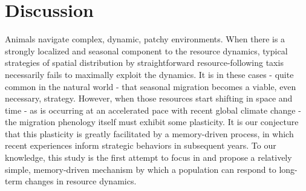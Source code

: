 \documentclass[12pt]{article}
\begin{document}
\hypertarget{discussion}{%
\section{Discussion}\label{discussion}}

Animals navigate complex, dynamic, patchy environments. When there is a
strongly localized and seasonal component to the resource dynamics,
typical strategies of spatial distribution by straightforward
resource-following taxis necessarily fails to maximally exploit the
dynamics. It is in these cases - quite common in the natural world -
that seasonal migration becomes a viable, even necessary, strategy.
However, when those resources start shifting in space and time - as is
occurring at an accelerated pace with recent global climate change - the
migration phenology itself must exhibit some plasticity. It is our
conjecture that this plasticity is greatly facilitated by a
memory-driven process, in which recent experiences inform strategic
behaviors in subsequent years. To our knowledge, this study is the first
attempt to focus in and propose a relatively simple, memory-driven
mechanism by which a population can respond to long-term changes in
resource dynamics.
\end{document}
